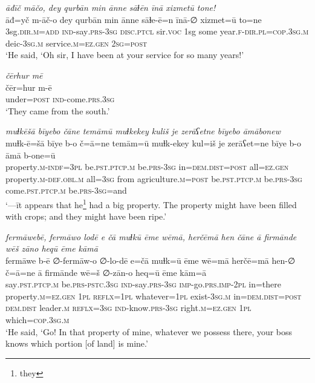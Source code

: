\ea \label{HB.82}
\textit{āđīč māčo, dey qurbān min ānne sāɫēn īnā xizmetū tone!} \\ 
\gll āđ=yč m-āč-o dey qurbān min ānne sāɫe-ē=n īnā-∅ xizmet=ū to=ne \\ 
 3sg\textsc{.dir}\textsc{.m}\textsc{=add} \textsc{ind-}say\textsc{.prs}\textsc{-3sg} \textsc{disc.ptcl} sir.\textsc{voc} 1sg some year\textsc{\textsc{.f}}\textsc{-dir}\textsc{.pl}\textsc{=cop}\textsc{.3sg}\textsc{.m} deic\textsc{-3sg}\textsc{.m} service\textsc{.m}\textsc{=ez}\textsc{.gen} \textsc{2sg}\textsc{=\textsc{post}} \\ 
\glt `He said, ‘Oh sir, I have been at your service for so many years!'
\z 
 
\ea \label{PM.2}
\textit{čērhur mē} \\ 
\gll čēr=hur m-ē \\ 
 under\textsc{=\textsc{post}} \textsc{ind-}come\textsc{.prs}\textsc{.3sg} \\ 
\glt `They came from the south.'
\z 
 
\ea \label{PM.18}
\textit{muɫkēšā bīyebo čāne temāmū muɫkekey kuliš je zerāʕetne bīyebo āmābonew} \\ 
\gll muɫk-ē=šā bīye b-o č=ā=ne temām=ū muɫk-ekey kul=iš je zerāʕet=ne bīye b-o āmā b-one=ū \\ 
 property\textsc{.m}\textsc{-indf}\textsc{=3pl} be\textsc{.pst}\textsc{.ptcp}\textsc{.m} be\textsc{.prs}\textsc{-3sg} in=\textsc{dem.dist}\textsc{=\textsc{post}} all\textsc{\textsc{=ez.gen}} property\textsc{.m}\textsc{-def}\textsc{.obl}\textsc{.m} all\textsc{=3sg} from agriculture\textsc{.m}\textsc{=\textsc{post}} be\textsc{.pst}\textsc{.ptcp}\textsc{.m} be\textsc{.prs}\textsc{-3sg} come\textsc{.pst}\textsc{.ptcp}\textsc{.m} be\textsc{.prs}\textsc{-3sg}=and \\ 
\glt `—īt appears that he\footnote{they} had a big property. The property might have been filled with crops; and they might have been ripe.'
\z 
 
\ea \label{PM.20}
\textit{fermāwebē, fermāwo lodē e čā muɫkū ēme wēmā, herčēmā hen čāne ā firmānde wēš zāno heqū ēme kāmā} \\ 
\gll fermāwe b-ē ∅-fermāw-o ∅-lo-dē e=čā muɫk=ū ēme wē=mā herčē=mā hen-∅ č=ā=ne ā firmānde wē=š ∅-zān-o heq=ū ēme kām=ā \\ 
 say\textsc{.pst}\textsc{.ptcp}\textsc{.m} be\textsc{.prs}\textsc{-pstc}\textsc{.3sg} \textsc{ind-}say\textsc{.prs}\textsc{-3sg} \textsc{imp-}go\textsc{.prs}.\textsc{imp-}\textsc{2pl} in=there property\textsc{.m}\textsc{\textsc{=ez.gen}} \textsc{1pl} \textsc{reflx}\textsc{=1pl} whatever\textsc{=1pl} exist\textsc{-3sg}\textsc{.m} in=\textsc{dem.dist}\textsc{=\textsc{post}} \textsc{dem.dist} leader\textsc{.m} \textsc{reflx}\textsc{=3sg} \textsc{ind-}know\textsc{.prs}\textsc{-3sg} right\textsc{.m}\textsc{\textsc{=ez.gen}} \textsc{1pl} which\textsc{=cop}\textsc{.3sg}\textsc{.m} \\ 
\glt `He said, ‘Go! In that property of mine, whatever we possess there, your boss knows which portion [of land] is mine.'
\z 
 
